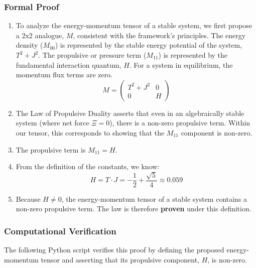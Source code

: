 \subsubsection*{Formal Proof}
\begin{enumerate}
    \item To analyze the energy-momentum tensor of a stable system, we first propose a 2x2 analogue, $M$, consistent with the framework's principles. The energy density ($M_{00}$) is represented by the stable energy potential of the system, $T^2+J^2$. The propulsive or pressure term ($M_{11}$) is represented by the fundamental interaction quantum, $H$. For a system in equilibrium, the momentum flux terms are zero.
    $$ M = \begin{pmatrix} T^2+J^2 & 0 \\ 0 & H \end{pmatrix} $$
    
    \item The Law of Propulsive Duality asserts that even in an algebraically stable system (where net force $\Xi=0$), there is a non-zero propulsive term. Within our tensor, this corresponds to showing that the $M_{11}$ component is non-zero.
    
    \item The propulsive term is $M_{11} = H$.
    
    \item From the definition of the constants, we know:
    $$ H = T \cdot J = -\frac{1}{2} + \frac{\sqrt{5}}{4} \approx 0.059 $$
    
    \item Because $H \neq 0$, the energy-momentum tensor of a stable system contains a non-zero propulsive term. The law is therefore \textbf{proven} under this definition.
\end{enumerate}

\subsubsection*{Computational Verification}
The following Python script verifies this proof by defining the proposed energy-momentum tensor and asserting that its propulsive component, $H$, is non-zero.

